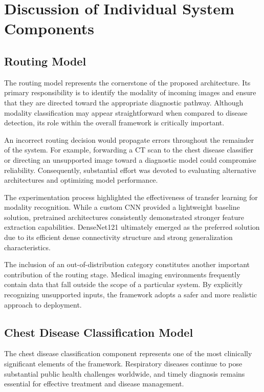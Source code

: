 \section{Discussion of Individual System Components}

\subsection{Routing Model}

The routing model represents the cornerstone of the proposed architecture. Its primary responsibility is to identify the modality of incoming images and ensure that they are directed toward the appropriate diagnostic pathway. Although modality classification may appear straightforward when compared to disease detection, its role within the overall framework is critically important.

An incorrect routing decision would propagate errors throughout the remainder of the system. For example, forwarding a CT scan to the chest disease classifier or directing an unsupported image toward a diagnostic model could compromise reliability. Consequently, substantial effort was devoted to evaluating alternative architectures and optimizing model performance.

The experimentation process highlighted the effectiveness of transfer learning for modality recognition. While a custom CNN provided a lightweight baseline solution, pretrained architectures consistently demonstrated stronger feature extraction capabilities. DenseNet121 ultimately emerged as the preferred solution due to its efficient dense connectivity structure and strong generalization characteristics.

The inclusion of an out-of-distribution category constitutes another important contribution of the routing stage. Medical imaging environments frequently contain data that fall outside the scope of a particular system. By explicitly recognizing unsupported inputs, the framework adopts a safer and more realistic approach to deployment.

\subsection{Chest Disease Classification Model}

The chest disease classification component represents one of the most clinically significant elements of the framework. Respiratory diseases continue to pose substantial public health challenges worldwide, and timely diagnosis remains essential for effective treatment and disease management.


